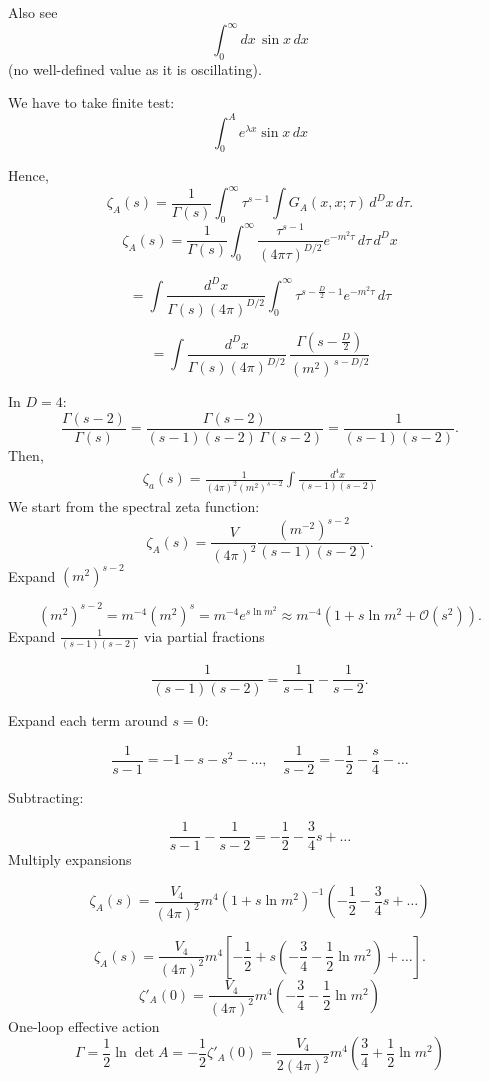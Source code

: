 \documentclass[14pt]{article} %
\begin{document}
\medskip

Also see
\[
\int_0^\infty dx \, \sin x \, dx
\]
(no well-defined value as it is oscillating).

We have to take finite test:
\[
\int_0^A e^{\lambda x} \sin x \, dx
\]

Hence,
\[
\zeta_A(s) = \frac{1}{\Gamma(s)} \int_0^\infty \tau^{s-1} \int G_A(x,x;\tau) \, d^D x \, d\tau.
\]
\[
\zeta_A(s) = \frac{1}{\Gamma(s)} \int_0^\infty \frac{\tau^{s-1}}{(4\pi \tau)^{D/2}} e^{-m^2 \tau} \, d\tau \, d^D x
\]

\[
= \int \frac{d^D x}{\Gamma(s)(4\pi)^{D/2}} \int_0^\infty \tau^{s - \tfrac{D}{2} - 1} e^{-m^2 \tau} \, d\tau
\]

\[
= \int \frac{d^D x}{\Gamma(s)(4\pi)^{D/2}} \, 
\frac{\Gamma\!\left(s - \tfrac{D}{2}\right)}{(m^2)^{\,s - D/2}}
\]

In $D=4$:
\[
\frac{\Gamma(s-2)}{\Gamma(s)} 
= \frac{\Gamma(s-2)}{(s-1)(s-2)\,\Gamma(s-2)}
= \frac{1}{(s-1)(s-2)}.
\]
Then, 
\begin{align*}
    \zeta_a(s) = \frac{1}{(4\pi)^2 (m^2)^{s-2}} \int \frac{d^4x}{(s-1)(s-2)}
\end{align*}
We start from the spectral zeta function:
\[
\zeta_A(s) = \frac{V}{(4\pi)^2} \frac{(m^{-2})^{s-2}}{(s-1)(s-2)}.
\]
Expand $(m^2)^{s-2}$

\[
(m^2)^{s-2} = m^{-4} (m^2)^s = m^{-4} e^{s \ln m^2} 
\approx m^{-4} (1 + s \ln m^2 + \mathcal{O}(s^2)).
\]
 Expand $\frac{1}{(s-1)(s-2)}$ via partial fractions

\[
\frac{1}{(s-1)(s-2)} = \frac{1}{s-1} - \frac{1}{s-2}.
\]

Expand each term around $s=0$:

\[
\frac{1}{s-1} = -1 - s - s^2 - \dots, \quad
\frac{1}{s-2} = -\frac{1}{2} - \frac{s}{4} - \dots
\]

Subtracting:

\[
\frac{1}{s-1} - \frac{1}{s-2} = -\frac{1}{2} - \frac{3}{4} s + \dots
\]
 Multiply expansions

\[
\zeta_A(s) = \frac{V_4}{(4\pi)^2} m^{4} (1 + s \ln m^2)^{-1} \left( -\frac{1}{2} - \frac{3}{4} s + \dots \right)
\]

\[
\zeta_A(s) = \frac{V_4}{(4\pi)^2} m^{4} \left[ -\frac{1}{2} + s \left( -\frac{3}{4} - \frac{1}{2} \ln m^2 \right) + \dots \right].
\]
\[
\zeta'_A(0) = \frac{V_4}{(4\pi)^2} m^{4} \left( -\frac{3}{4} - \frac{1}{2} \ln m^2 \right)
\]
One-loop effective action
\[
\Gamma = \frac{1}{2} \ln \det A = - \frac{1}{2} \zeta'_A(0) 
= \frac{V_4}{2 (4\pi)^2} m^{4} \left( \frac{3}{4} + \frac{1}{2} \ln m^2 \right)
\]
\end{document}
